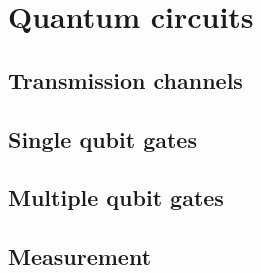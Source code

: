 \section{Quantum circuits}
\subsection{Transmission channels}
\subsection{Single qubit gates}
\subsection{Multiple qubit gates}
\subsection{Measurement}\label{sec:measurement}